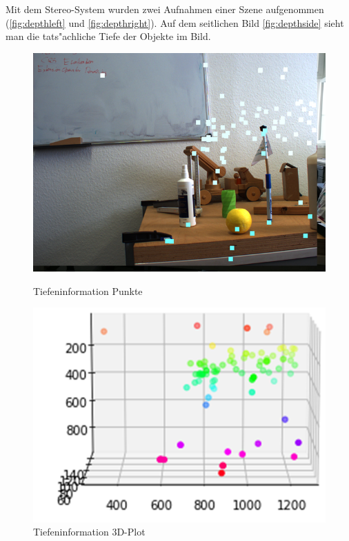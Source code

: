 \noindent Mit dem Stereo-System wurden zwei Aufnahmen einer Szene aufgenommen (\ref{fig:depthleft} und \ref{fig:depthright}). Auf dem seitlichen Bild \ref{fig:depthside} sieht man die tats"achliche Tiefe der Objekte im Bild.

\begin{figure}[!htb]
	\includegraphics[width=\linewidth]{bilder/depth_result}
	\caption{Tiefeninformation Punkte}\label{fig:depthpoints}
	\endminipage\hfill
	\includegraphics[width=\linewidth]{bilder/depth_coord}
	\caption{Tiefeninformation 3D-Plot}\label{fig:depthplot}
	\endminipage\hfill
\end{figure}

